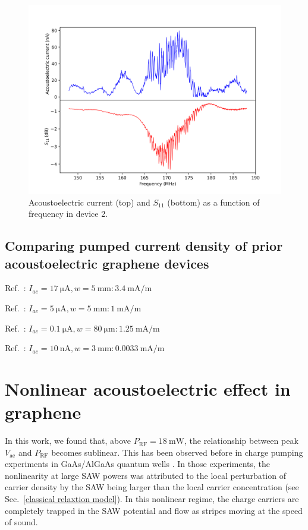 \documentclass[double,12pt,1in,seploa]{beavtex}
\let\Oldsection\section
\renewcommand{\section}{\FloatBarrier\Oldsection}
\let\Oldsubsection\subsection
\renewcommand{\subsection}{\FloatBarrier\Oldsubsection}
\begin{document}
\begin{figure}
    \includegraphics[width = 1\textwidth]{Figure S3, AEC vs S11.png}
    \caption{Acoustoelectric current (top) and $S_{11}$ (bottom) as a function of frequency in device 2.}
    \label{AECP Figure S3}
\end{figure}

\subsection{Comparing pumped current density of prior acoustoelectric graphene devices}

Ref.\ \cite{okuda_graphene_2018}: $I_{ae} = \SI{17}{\micro \ampere}, w = \SI{5}{\milli\meter}: \SI{3.4}{\milli \ampere/\meter}$

\noindent
Ref.\ \cite{okuda_acoustic_2016}: $I_{ae} = \SI{5}{\micro \ampere}, w = \SI{5}{\milli\meter}: \SI{1}{\milli \ampere/\meter}$

\noindent
Ref.\ \cite{tang_ultra-low_2017}: $I_{ae} = \SI{0.1}{\micro \ampere}, w = \SI{80}{\micro\meter}: \SI{1.25}{\milli \ampere/\meter}$

\noindent
Ref.\ \cite{bandhu_controlling_2016}: $I_{ae} = \SI{10}{\nano \ampere}, w = \SI{3}{\milli\meter}: \SI{0.0033}{\milli \ampere/\meter}$


\section{Nonlinear acoustoelectric effect in graphene} \label{nonlinear acoustoelectric effect}

In this work, we found that, above $P_{\mathrm{RF}} = \SI{18}{\milli\watt}$, the relationship between peak $V_{\mathrm{ae}}$ and $P_{\mathrm{RF}}$ becomes sublinear. This has been observed before in charge pumping experiments in GaAs/AlGaAs quantum wells \cite{rotter_charge_1999,rotter_nonlinear_1999}. In those experiments, the nonlinearity at large SAW powers was attributed to the local perturbation of carrier density by the SAW being larger than the local carrier concentration (see Sec.\ \ref{classical relaxtion model}). In this nonlinear regime, the charge carriers are completely trapped in the SAW potential and flow as stripes moving at the speed of sound.
\end{document}

